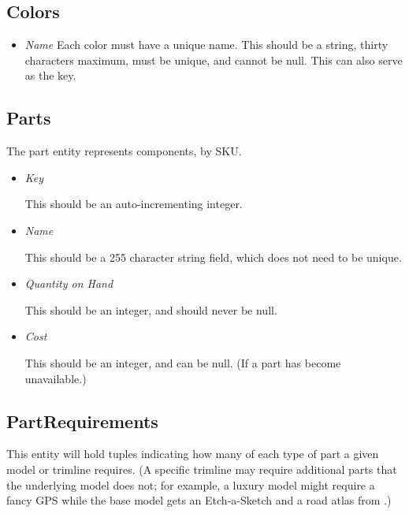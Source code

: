 \documentclass[11pt,letterpaper,oneside]{amsart}
\begin{document}
\subsection*{Colors}

\begin{itemize}
	\item \emph	{Name}
		Each color must have a unique name.  This should be a string, thirty characters maximum, must be unique, and cannot be null.  This can also serve as the key.
		
\end{itemize}

\subsection*{Parts}

The part entity represents components, by SKU.

\begin{itemize}

\item \emph{Key}

	This should be an auto-incrementing integer.
	
\item \emph{Name}

	This should be a 255 character string field, which does not need to be unique.
	
\item \emph{Quantity on Hand}

	This should be an integer, and should never be null.
	
\item \emph{Cost}

	This should be an integer, and can be null. (If a part has become unavailable.)
	
\end{itemize}

\subsection*{PartRequirements}

This entity will hold tuples indicating how many of each type of part a given model or trimline requires.  (A specific trimline may require additional parts that the underlying model does not; for example, a luxury model might require a fancy GPS while the base model gets an Etch-a-Sketch and a road atlas from .)
\end{document}
